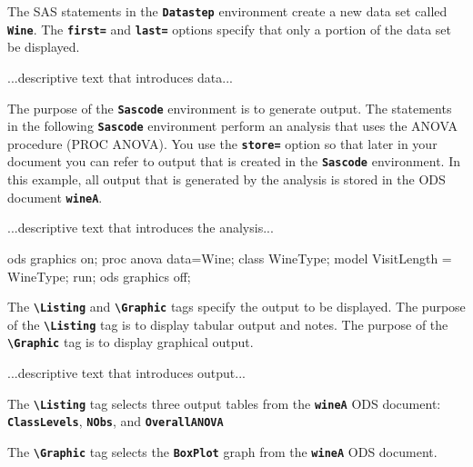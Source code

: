 \documentclass{article}
\newcommand*{\Code}[1]{\texttt{\textbf{#1}}}
\newcommand*{\cs}[1]{\texttt{\textbf{\textbackslash#1}}}
\begin{document}
The SAS statements in the \Code{Datastep} environment create a new data set
called \Code{Wine}. The \Code{first=} and \Code{last=} options specify that
only a portion of the data set be displayed.

...descriptive text that introduces data...


The purpose of the \Code{Sascode} environment is to generate output.
The statements in the following \Code{Sascode} environment perform an
analysis that uses the ANOVA procedure (PROC ANOVA).
You use the \Code{store=} option so that
later in your document
you can refer to output that is created in the \Code{Sascode}
environment.
In this example, all output that is generated by the analysis is stored in the ODS document
\Code{wineA}.

...descriptive text that introduces the analysis...

\begin{Sascode}[store=wineA]
ods graphics on;
proc anova data=Wine;
   class WineType;
   model VisitLength = WineType;
run;
ods graphics off;
\end{Sascode}
The \cs{Listing} and \cs{Graphic} tags specify the output to be displayed.
The purpose of the \cs{Listing} tag is to display tabular output and notes.
The purpose of the \cs{Graphic} tag is to display graphical output.

...descriptive text that introduces output...

The \cs{Listing} tag selects three output tables from the \Code{wineA} ODS document:
\Code{ClassLevels}, \Code{NObs}, and \Code{OverallANOVA}


The \cs{Graphic} tag selects the \Code{BoxPlot}
graph from the \Code{wineA} ODS document.
\end{document}
